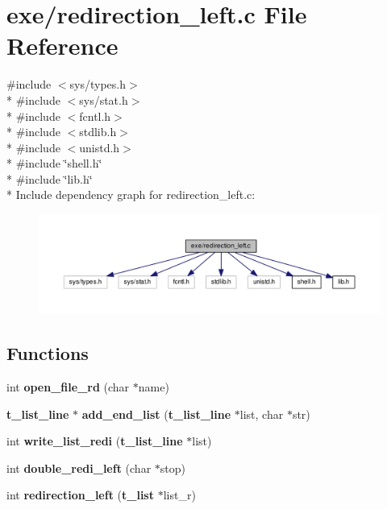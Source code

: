 \section{exe/redirection\-\_\-left.c File Reference}
\label{redirection__left_8c}
{\ttfamily \#include $<$sys/types.\-h$>$}\\*
{\ttfamily \#include $<$sys/stat.\-h$>$}\\*
{\ttfamily \#include $<$fcntl.\-h$>$}\\*
{\ttfamily \#include $<$stdlib.\-h$>$}\\*
{\ttfamily \#include $<$unistd.\-h$>$}\\*
{\ttfamily \#include \char`\"{}shell.\-h\char`\"{}}\\*
{\ttfamily \#include \char`\"{}lib.\-h\char`\"{}}\\*
Include dependency graph for redirection\-\_\-left.\-c\-:\nopagebreak
\begin{figure}[H]
\begin{center}
\leavevmode
\includegraphics[width=350pt]{redirection__left_8c__incl}
\end{center}
\end{figure}
\subsection*{Functions}
\begin{DoxyCompactItemize}
\item 
int {\bf open\-\_\-file\-\_\-rd} (char $\ast$name)
\item 
{\bf t\-\_\-list\-\_\-line} $\ast$ {\bf add\-\_\-end\-\_\-list} ({\bf t\-\_\-list\-\_\-line} $\ast$list, char $\ast$str)
\item 
int {\bf write\-\_\-list\-\_\-redi} ({\bf t\-\_\-list\-\_\-line} $\ast$list)
\item 
int {\bf double\-\_\-redi\-\_\-left} (char $\ast$stop)
\item 
int {\bf redirection\-\_\-left} ({\bf t\-\_\-list} $\ast$list\-\_\-r)
\end{DoxyCompactItemize}


